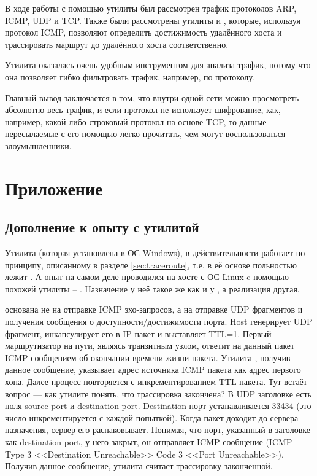 В ходе работы с помощью утилиты  был рассмотрен трафик протоколов ARP, ICMP, UDP и TCP. Также были рассмотрены утилиты  и , которые, используя протокол ICMP, позволяют определить достижимость удалённого хоста и трассировать маршрут до удалённого хоста соответственно.

Утилита  оказалась очень удобным инструментом для анализа трафик, потому что она позволяет гибко фильтровать трафик, например, по протоколу.

Главный вывод заключается в том, что внутри одной сети можно просмотреть абсолютно весь трафик, и если протокол не использует шифрование, как, например, какой-либо строковый протокол на основе TCP, то данные пересылаемые с его помощью легко прочитать, чем могут воспользоваться злоумышленники.

\section{Приложение}

\subsection{Дополнение к опыту с утилитой }

Утилита  (которая установлена в ОС Windows), в действительности работает по принципу, описанному в разделе \ref{sec:traceroute}, т.е, в её основе польностью лежит . А опыт на самом деле проводился на хосте с ОС Linux c помощью похожей утилиты -- . Назначение у неё такое же как и у , а реализация другая.

 основана не на отправке ICMP эхо-запросов, а на отправке UDP фрагментов и получения сообщения о доступности/достижимости порта. Host генерирует UDP фрагмент, инкапсулирует его в IP пакет и выставляет TTL=1. Первый маршрутизатор на пути, являясь транзитным узлом, ответит на данный пакет ICMP сообщением об окончании времени жизни пакета. Утилита , получив данное сообщение, указывает адрес источника ICMP пакета как адрес первого хопа. Далее процесс повторяется с инкрементированием TTL пакета. Тут встаёт вопрос --- как утилите понять, что трассировка закончена? В UDP заголовке есть поля source port и destination port. Destination порт устанавливается 33434 (это число инкрементируется с каждой попыткой). Когда пакет доходит до сервера назначения, сервер его распаковывает. Понимая, что порт, указанный в заголовке как destination port, у него закрыт, он отправляет ICMP сообщение (ICMP Type 3 <<Destination Unreachable>> Code 3 <<Port Unreachable>>).  Получив данное сообщение, утилита  считает трассировку законченной.

